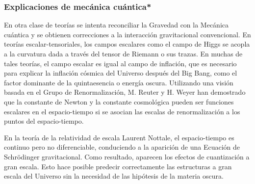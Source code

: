 \subsubsection{Explicaciones de mecánica cuántica*}

En otra clase de teorías se intenta reconciliar la Gravedad con la Mecánica cuántica y se obtienen correcciones a la interacción gravitacional convencional. En teorías escalar-tensoriales, los campos escalares como el campo de Higgs se acopla a la curvatura dada a través del tensor de Riemann o sus trazas. En muchas de tales teorías, el campo escalar es igual al campo de inflación, que es necesario para explicar la inflación cósmica del Universo después del Big Bang, como el factor dominante de la quintaesencia o energía oscura. Utilizando una visión basada en el Grupo de Renormalización, M. Reuter y H. Weyer han demostrado que la constante de Newton y la constante cosmológica pueden ser funciones escalares en el espacio-tiempo si se asocian las escalas de renormalización a los puntos del espacio-tiempo.

En la teoría de la relatividad de escala Laurent Nottale, el espacio-tiempo es continuo pero no diferenciable, conduciendo a la aparición de una Ecuación de Schrödinger gravitacional. Como resultado, aparecen los efectos de cuantización a gran escala. Esto hace posible predecir correctamente las estructuras a gran escala del Universo sin la necesidad de las hipótesis de la materia oscura.













